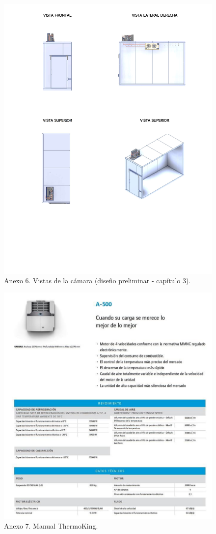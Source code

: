 	 	\begin{figure}[H]
	 	\centering
	 	\includegraphics[width=0.7\linewidth]{figures/planos.pdf}
	 	\caption*{Anexo 6. Vistas de la cámara (diseño preliminar - capítulo 3).}
	 	\label{axo-planos}
	 \end{figure}
	 
 \begin{figure}[H]
 	\centering
 	\includegraphics[width=0.8\linewidth]{figures/axo-manual-thermo-king}
	\caption*{Anexo 7. Manual ThermoKing.}
 	\label{fig:axo-manual-thermo-king}
 \end{figure}
 
	 
	 